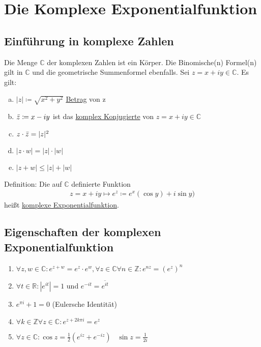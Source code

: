 \section{Die Komplexe Exponentialfunktion}

\subsection{Einführung in komplexe Zahlen}
Die Menge $\mathbb{C}$ der komplexen Zahlen ist ein Körper. Die Binomische(n) Formel(n) gilt in $\mathbb{C}$ und die geometrische Summenformel
ebenfalls. Sei $z=x+iy \in \mathbb{C}$. Es gilt:
\begin{enumerate} [a)]
    \item $|z| \coloneqq \sqrt{x^2 + y^2}$ \underline{Betrag} von z
    \item $\Bar{z} \coloneqq x-iy$ ist das \underline{komplex Konjugierte} von $z=x+iy \in \mathbb{C}$
    \item $z \cdot \Bar{z} = |z|^2$
    \item $|z \cdot w| = |z| \cdot |w|$
    \item $|z+w| \leq |z| + |w|$
\end{enumerate}

Definition: Die auf $\mathbb{C}$ definierte Funktion
\begin{align*}
    z=x+iy \mapsto e^z \coloneqq e^x (\cos y) + i\sin y)
\end{align*}
heißt \underline{komplexe Exponentialfunktion}.

\subsection{Eigenschaften der komplexen Exponentialfunktion}
\begin{enumerate}
    \item $\forall z,w \in \mathbb{C}: e^{z+w} = e^z \cdot e^w, \forall z \in \mathbb{C} \forall n \in \mathbb{Z}: e^{nz}=(e^z)^n$
    \item $\forall t \in \mathbb{R}: |e^{it}| = 1$ und $e^{-it} = \overline{e^{it}}$
    \item $e^{\pi i} + 1 = 0$ (Eulersche Identität)
    \item $\forall k \in \mathbb{Z} \forall z \in \mathbb{C}: e^{z+2k\pi i} = e^z$
    \item $\forall z \in \mathbb{C}: \cos z = \frac{1}{2} (e^{iz} + e^{-iz})$ \, $\sin z = \frac{1}{2i}$
\end{enumerate}

